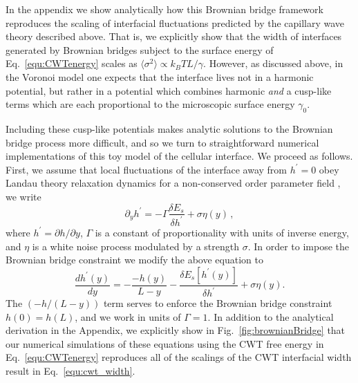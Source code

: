 \documentclass[twoside,twocolumn,9pt]{article}
\begin{document}
In the appendix we show analytically how this Brownian bridge framework reproduces the scaling of interfacial fluctuations predicted by the capillary wave theory described above. That is, we explicitly show that the width of interfaces generated by Brownian bridges subject to the surface energy of  Eq.~\ref{equ:CWTenergy} scales as $\langle\sigma^{2}\rangle\propto {k_{B}T}L/\gamma$. However, as discussed above, in the Voronoi model one expects that the interface lives not in a harmonic potential, but rather in a potential which combines harmonic \emph{and} a cusp-like terms which are each proportional to the microscopic surface energy $\gamma_0$. 

Including these cusp-like potentials makes analytic solutions to the Brownian bridge process more difficult, and so we turn to straightforward numerical implementations of this toy model of the cellular interface. We proceed as follows. First, we assume that local fluctuations of the interface away from $h^{\prime}=0$ obey Landau theory relaxation dynamics for a non-conserved order parameter field \cite{goldenfeld2018lectures}, we write
\begin{equation}
    \label{eq::defn_LandauRelaxationDynamics}
    \partial_{y}h^{\prime} = -\Gamma\frac{\delta{E_s}}{\delta{h}^{\prime}}+ \sigma\eta(y)\,,
\end{equation}
where $h^{\prime}=\partial{h}/\partial{y}$, $\Gamma$ is a constant of proportionality with units of inverse energy, and $\eta$ is a white noise process modulated by a strength $\sigma$. In order to impose the Brownian bridge constraint we modify the above equation to \cite{ross1995stochastic}
\begin{equation}
    \label{eq::defn_LandauRelaxationDynamics_numeric}
    \frac{dh^{\prime}(y)}{dy} = -\frac{-h(y)}{L-y} - \frac{\delta{E_s}[h^{\prime}(y)]}{\delta{h}^{\prime}} + \sigma\eta(y).
\end{equation}
The  $(-h/(L-y))$ term serves to enforce the Brownian bridge constraint $h(0)=h(L)$, and we work in units of $\Gamma=1$. In addition to the analytical derivation in the Appendix, we explicitly show in Fig.~\ref{fig:brownianBridge} that our numerical simulations of these equations using the CWT free energy in Eq.~\ref{equ:CWTenergy} reproduces all of the scalings of the CWT interfacial width result in Eq.~\ref{equ:cwt_width}. 
\end{document}
